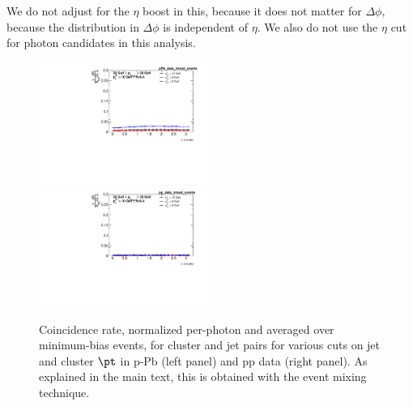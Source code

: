 We do not adjust for the $\eta$ boost in this, because it does not matter for $\Delta \phi$, because the distribution in $\Delta \phi$ is independent of $\eta$. We also do not use the $\eta$ cut for photon candidates in this analysis.

\begin{figure}[h]
\centering
\includegraphics[width=0.495\textwidth]{GammaJet/sig_dPhipPb_data_mixed_events_Comparison.pdf}
\includegraphics[width=0.495\textwidth]{GammaJet/sig_dPhipp_data_mixed_events_Comparison.pdf}
\caption{Coincidence rate, normalized per-photon and averaged over minimum-bias events, for cluster and jet pairs for various cuts on jet and cluster $\pt$ in p-Pb (left panel) and pp data (right panel). As explained in the main text, this is obtained with the event mixing technique.}
\label{4layerdPhi}
\end{figure}

